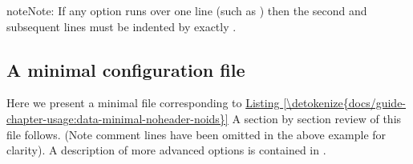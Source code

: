 \documentclass[letterpaper,10pt,english,openany,oneside]{sphinxmanual}
\begin{document}
\begin{sphinxadmonition}{note}{Note:}
\sphinxAtStartPar
If any option runs over one line (such as ) then
the second and subsequent lines must be indented by exactly .
\end{sphinxadmonition}


\subsection{A minimal configuration file}
\label{\detokenize{docs/guide-chapter-usage:a-minimal-configuration-file}}\label{\detokenize{docs/guide-chapter-usage:config-minimal}}
\sphinxAtStartPar
Here we present a minimal  file corresponding to
\hyperref[\detokenize{docs/guide-chapter-usage:data-minimal-noheader-noids}]{Listing \ref{\detokenize{docs/guide-chapter-usage:data-minimal-noheader-noids}}} A section by section
review of this file follows. (Note comment lines have been omitted in
the above example for clarity). A description of more advanced options
is contained in {\hyperref[\detokenize{docs/guide-chapter-usage:config-advanced}]{}}.
\def\sphinxLiteralBlockLabel{\label{\detokenize{docs/guide-chapter-usage:config-minimal-example}}}
%
\begin{sphinxVerbatim}[commandchars=\\\{\}]





\end{sphinxVerbatim}
\sphinxresetverbatimhllines
\end{document}
